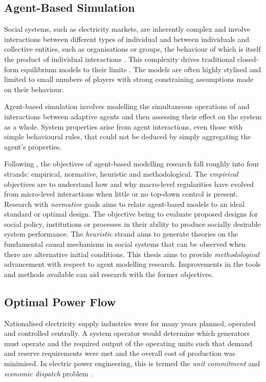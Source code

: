 \subsection{Agent-Based Simulation}
Social systems, such as electricity markets, are inherently complex and involve
interactions between different types of individual and between individuals and
collective entities, such as organisations or groups, the behaviour of which is
itself the product of individual interactions \cite{rossiter:2010}.  This
complexity drives traditional closed-form equilibrium models to their limits
\cite{ehrenmann:2009}. The models are often highly stylised and limited to small
numbers of players with strong constraining assumptions made on their behaviour.

Agent-based simulation involves modelling the simultaneous operations of and
interactions between adaptive agents and then assessing their effect on the
system as a whole.  System properties arise from agent interactions, even those
with simple behavioural rules, that could not be deduced by simply aggregating
the agent's properties. %

Following , the objectives of agent-based modelling
research fall roughly into four strands: empirical, normative, heuristic and
methodological. The \textit{empirical} objectives are to understand how and why
macro-level regularities have evolved from micro-level interactions when little
or no top-down control is present.  Research with \textit{normative} goals aims
to relate agent-based models to an ideal standard or optimal design.  The
objective being to evaluate proposed designs for social policy, institutions or
processes in their ability to produce socially desirable system performance. The
\textit{heuristic} strand aims to generate theories on the fundamental causal
mechanisms in social systems that can be observed when there are alternative
initial conditions.  This thesis aims to provide \textit{methodological}
advancement with respect to agent modelling research.  Improvements in the tools
and methods available can aid research with the former objectives.

\subsection{Optimal Power Flow}
\label{sec:opf}
Nationalised electricity supply industries were for many years planned, operated
and controlled centrally.  A system operator would determine which generators
must operate and the required output of the operating units such that demand and
reserve requirements were met and the overall cost of production was minimised.
In electric power engineering, this is termed the \textit{unit commitment} and
\textit{economic dispatch} problem \cite{wood:pgoc}.

